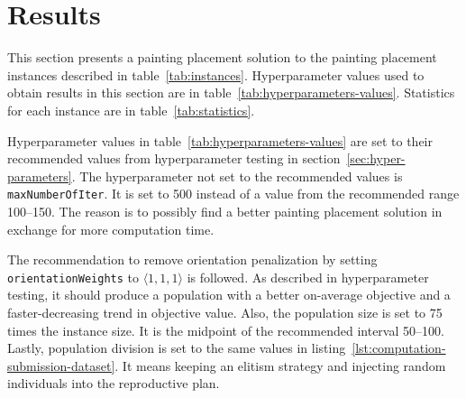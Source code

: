 \clearpage%
\newpage


\section{Results}\label{sec:results}
This section presents a painting placement solution to the painting placement instances described in table~\ref{tab:instances}.
Hyperparameter values used to obtain results in this section are in table~\ref{tab:hyperparameters-values}.
Statistics for each instance are in table~\ref{tab:statistics}.

Hyperparameter values in table~\ref{tab:hyperparameters-values} are set to their recommended values
from hyperparameter testing in section~\ref{sec:hyper-parameters}.
The hyperparameter not set to the recommended values is \verb|maxNumberOfIter|.
It is set to 500 instead of a value from the recommended range \numrange{100}{150}.
The reason is to possibly find a better painting placement solution in exchange for more computation time.

The recommendation to remove orientation penalization by setting \verb|orientationWeights| to $\langle 1,1,1\rangle$ is followed.
As described in hyperparameter testing, it should produce a population with a better on-average objective and a faster-decreasing trend in objective value.
Also, the population size is set to 75 times the instance size.
It is the midpoint of the recommended interval \numrange{50}{100}.
Lastly, population division is set to the same values in listing~\ref{lst:computation-submission-dataset}.
It means keeping an elitism strategy and injecting random individuals into the reproductive plan.


